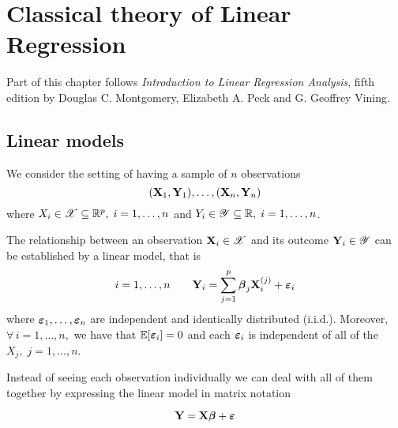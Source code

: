 \chapter{Classical theory of Linear Regression}

Part of this chapter follows \textit{Introduction to Linear Regression Analysis}, fifth edition by Douglas C. Montgomery, Elizabeth A. Peck and G. Geoffrey Vining.

\section{Linear models}

We consider the setting of having a sample of $n$ observations
\[
    (\mathbf{X}_1, \mathbf{Y}_1), \ldots ,(\mathbf{X}_n, \mathbf{Y}_n)
\]
where $X_i \in \mathscr{X} \subseteq \mathbb{R}^p, \; i = 1, \ldots, n$ and $Y_i \in \mathscr{Y} \subseteq \mathbb{R}, \; i = 1, \ldots, n$.

\begin{definition}
    The relationship between an observation $\mathbf{X}_i \in \mathscr{X}$ and its outcome $\mathbf{Y}_i \in \mathscr{Y}$ can be established by a linear model, that is
    \begin{equation}
        i = 1, \ldots, n \qquad \mathbf{Y}_{i} = \sum_{j=1}^{p} \boldsymbol{\beta}_{j} \mathbf{X}_{i}^{(j)} + \boldsymbol{\varepsilon}_{i}
    \end{equation}
    where \(\boldsymbol{\varepsilon}_1, \ldots, \boldsymbol{\varepsilon}_n\) are independent and identically distributed (i.i.d.). Moreover, \(\forall \, i = 1, \ldots, n, \) we have that \( \mathbb{E} [\boldsymbol{\varepsilon}_i] = 0\) and each \(\boldsymbol{\varepsilon}_i\) is independent of all of the \( X_j, \; j=1, \ldots, n \).
\end{definition}

Instead of seeing each observation individually we can deal with all of them together by expressing the linear model in matrix notation

\begin{equation}
    \label{eqn: linear model (matrix)}
    \mathbf{Y} = \mathbf{X} \boldsymbol{\beta} + \boldsymbol{\varepsilon}
\end{equation}

